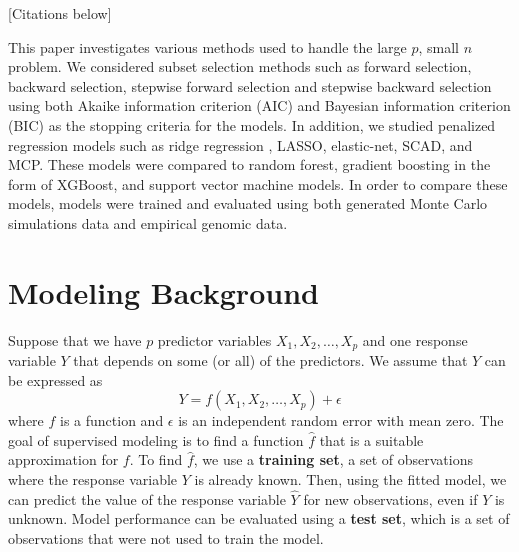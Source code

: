 \documentclass{article}
\begin{document}

[Citations below]

This paper investigates various methods used to handle the large $p$, small $n$ problem. We considered subset selection methods such as forward selection, backward selection, stepwise forward selection and stepwise backward selection using both Akaike information criterion (AIC) and Bayesian information criterion (BIC) as the stopping criteria for the models. In addition, we studied penalized regression models such as ridge regression \cite{hoerl1970ridge}, LASSO, elastic-net, SCAD, and MCP. These models were compared to random forest, gradient boosting in the form of XGBoost, and support vector machine models. In order to compare these models, models were trained and evaluated using both generated Monte Carlo simulations data and empirical genomic data.

\section{Modeling Background}


Suppose that we have $p$ predictor variables $X_1, X_2, \dotsc, X_p$ and one response variable $Y$ that depends on some (or all) of the predictors. We assume that $Y$ can be expressed as
\begin{equation}\label{eqn:relationship}
	Y = f(X_1, X_2, \dotsc, X_p) + \epsilon
\end{equation}
where $f$ is a function and $\epsilon$ is an independent random error with mean zero. The goal of supervised modeling is to find a function $\hat{f}$ that is a suitable approximation for $f$. To find $\hat{f}$, we use a \textbf{training set}, a set of observations where the response variable $Y$ is already known. Then, using the fitted model, we can predict the value of the response variable $\hat{Y}$ for new observations, even if $Y$ is unknown. Model performance can be evaluated using a \textbf{test set}, which is a set of observations that were not used to train the model.
\end{document}
